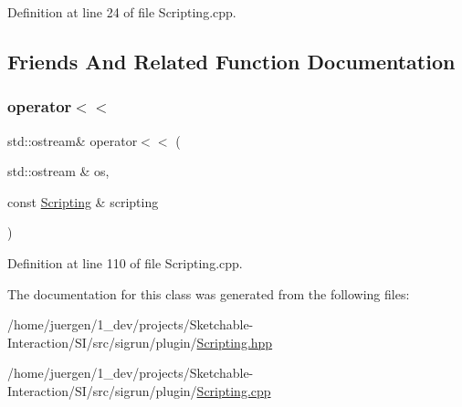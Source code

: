 Definition at line 24 of file Scripting.\+cpp.



\subsection{Friends And Related Function Documentation}
\mbox{\label{class_scripting_abcaa4273b349e6258949c5b1c7fa8277}} 
\subsubsection{\texorpdfstring{operator$<$$<$}{operator<<}}
{\footnotesize\ttfamily std\+::ostream\& operator$<$$<$ (\begin{DoxyParamCaption}\item[{std\+::ostream \&}]{os,  }\item[{const \mbox{\hyperlink{class_scripting}{Scripting}} \&}]{scripting }\end{DoxyParamCaption})\hspace{0.3cm}{\ttfamily [friend]}}



Definition at line 110 of file Scripting.\+cpp.



The documentation for this class was generated from the following files\+:\begin{DoxyCompactItemize}
\item 
/home/juergen/1\+\_\+dev/projects/\+Sketchable-\/\+Interaction/\+S\+I/src/sigrun/plugin/\mbox{\hyperlink{_scripting_8hpp}{Scripting.\+hpp}}\item 
/home/juergen/1\+\_\+dev/projects/\+Sketchable-\/\+Interaction/\+S\+I/src/sigrun/plugin/\mbox{\hyperlink{_scripting_8cpp}{Scripting.\+cpp}}\end{DoxyCompactItemize}
